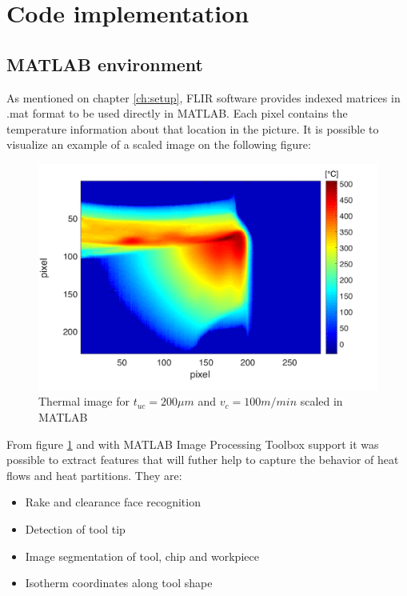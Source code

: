 \section{Code implementation}
\label{sec:codeimpl}

	\subsection{MATLAB environment}
		As mentioned on chapter \ref{ch:setup}, FLIR software provides indexed matrices in .mat format to be used directly in MATLAB. Each pixel contains the temperature information about that location in the picture. It is possible to visualize an example of a scaled image on the following figure:

		\begin{figure}[H]
			\centering
			\captionsetup{justification=centering}
			\includegraphics[scale=0.6]{Cap4/TempDist.png}
			\caption{Thermal image for $t_{uc} = 200\mu m$ and $v_{c} = 100 m/min$ scaled in MATLAB}
			\label{fig:tempdist}
		\end{figure}

		From figure \ref{fig:tempdist} and with MATLAB Image Processing Toolbox support it was possible to extract features that will futher help to capture the behavior of heat flows and heat partitions. They are:

		\begin{itemize}
			\item Rake and clearance face recognition
			\item Detection of tool tip
			\item Image segmentation of tool, chip and workpiece
			\item Isotherm coordinates along tool shape
		\end{itemize}
	
